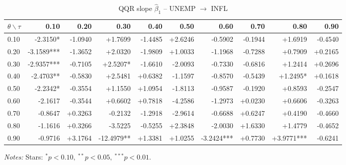 \begin{table}[!htbp]
  \centering
  \caption{QQR slope $\hat{\beta}_1$ -- UNEMP $\to$ INFL}
  \label{tab:qqr}
  \begin{tabular}{lrrrrrrrrr}
    \toprule
    $\theta \backslash \tau$ & 0.10 & 0.20 & 0.30 & 0.40 & 0.50 & 0.60 & 0.70 & 0.80 & 0.90 \\
    \midrule
    0.10 & -2.3150* & -1.0940 & +1.7699 & -1.4485 & +2.6246 & -0.5902 & -0.1944 & +1.6919 & -0.4540 \\
    0.20 & -3.1589*** & -1.3652 & +2.0320 & -1.9809 & +1.0033 & -1.1968 & -0.7288 & +0.7909 & +0.2165 \\
    0.30 & -2.9357*** & -0.7105 & +2.5207* & -1.6610 & -2.0093 & -0.7330 & -0.6816 & +1.2414 & +0.2696 \\
    0.40 & -2.4703** & -0.5830 & +2.5481 & +0.6382 & -1.1597 & -0.8570 & -0.5439 & +1.2495* & +0.1618 \\
    0.50 & -2.2342* & -0.3554 & +1.1550 & +1.0954 & -1.8113 & -0.9587 & -0.1920 & +0.8593 & -0.2547 \\
    0.60 & -2.1617 & -0.3544 & +0.6602 & +0.7818 & -4.2586 & -1.2973 & +0.0230 & +0.6606 & -0.3263 \\
    0.70 & -0.8647 & +0.3263 & -0.2132 & -1.2918 & -2.9614 & -0.6688 & +0.6247 & +0.4190 & -0.4660 \\
    0.80 & -1.1616 & +0.3266 & -3.5225 & -0.5255 & +2.3848 & -2.0030 & +1.6330 & +1.4779 & -0.4652 \\
    0.90 & -0.9716 & +3.1764 & -12.4979** & +1.3381 & +1.0255 & -3.2424*** & +0.7730 & +3.9771*** & -0.6241 \\
    \bottomrule
  \end{tabular}
  \par\medskip\footnotesize\textit{Notes:} Stars: $^*p<0.10,\ ^{**}p<0.05,\ ^{***}p<0.01$.
\end{table}